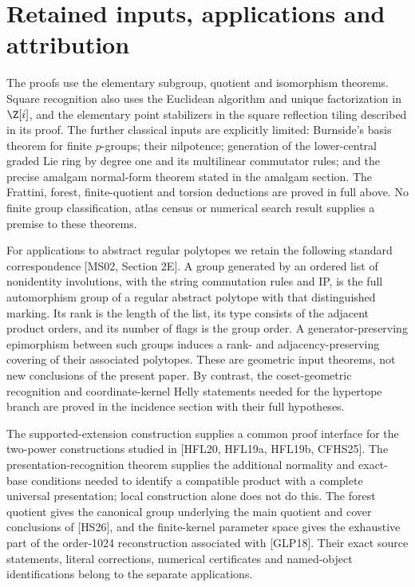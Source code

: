 \section{Retained inputs, applications and attribution}\label{retained-inputs-applications-and-attribution}

The proofs use the elementary subgroup, quotient and isomorphism
theorems. Square recognition also uses the Euclidean algorithm and unique
factorization in $\Z[i]$, and the elementary point stabilizers in the
square reflection tiling described in its proof. The further classical
inputs are explicitly limited:
Burnside's basis theorem for finite \(p\)-groups; their nilpotence;
generation of the lower-central graded Lie ring by degree one and its
multilinear commutator rules; and the precise amalgam normal-form
theorem stated in the amalgam section. The Frattini, forest, finite-quotient and
torsion deductions are proved in full above. No finite group
classification, atlas census or numerical search result supplies a
premise to these theorems.

For applications to abstract regular polytopes we retain the following
standard correspondence {[}MS02, Section 2E{]}. A group generated by an
ordered list of nonidentity involutions, with the string commutation
rules and IP, is the full automorphism group of a regular abstract
polytope with that distinguished marking. Its rank is the length of the
list, its type consists of the adjacent product orders, and its number
of flags is the group order. A generator-preserving epimorphism between
such groups induces a rank- and adjacency-preserving covering of their
associated polytopes. These are geometric input theorems, not new
conclusions of the present paper. By contrast, the coset-geometric
recognition and coordinate-kernel Helly statements needed for the
hypertope branch are proved in the incidence section with their full hypotheses.

The supported-extension construction supplies a common proof interface
for the two-power constructions studied in {[}HFL20, HFL19a, HFL19b,
CFHS25{]}. The presentation-recognition theorem supplies the additional normality and
exact-base conditions needed to identify a compatible product with a complete
universal presentation; local construction alone does not do this.
The forest quotient gives the canonical group underlying the main
quotient and cover conclusions of {[}HS26{]}, and the finite-kernel
parameter space gives the exhaustive part of the order-1024
reconstruction associated with {[}GLP18{]}. Their exact source
statements, literal corrections, numerical certificates and named-object
identifications belong to the separate applications.

